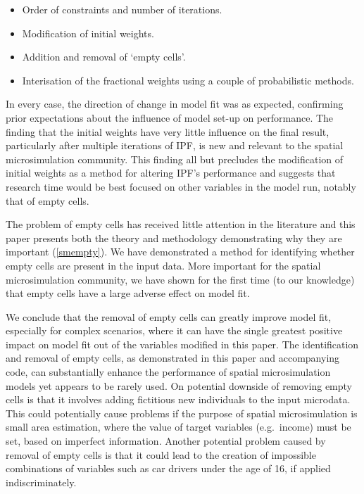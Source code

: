\documentclass[a4paper,10pt]{article}
\begin{document}
\begin{itemize}
 \item Order of constraints and number of iterations.
 \item Modification of initial weights.
 \item Addition and removal of `empty cells'.
 \item Interisation of the fractional weights using a couple of probabilistic methods.
\end{itemize}


In every case, the direction of change in model fit was as expected, confirming
prior expectations about the influence of model set-up on performance. The finding
that the initial weights have very little influence on the final result, particularly
after multiple iterations of IPF, is new and relevant to the spatial microsimulation
community. This finding all but precludes the modification of initial weights as
a method for altering IPF's performance and suggests that research time would be
best focused on other variables in the model run, notably that of empty cells.

The problem of empty cells has received little attention in the literature and
this paper presents both the theory and methodology demonstrating why they are important
(\cref{smempty}). We have demonstrated a method for identifying
whether empty cells are present in the input data. More important for the spatial microsimulation
community, we have shown for the first time (to our knowledge) that empty cells have a
large adverse effect on model fit.

We conclude that the removal of empty cells can greatly improve model fit,
especially for complex scenarios, where it can have the single greatest positive impact
on model fit out of the variables modified in this paper.
The identification and removal of empty cells, as
demonstrated in this paper and accompanying code, can substantially enhance the performance of
spatial microsimulation models yet appears to be rarely used.
On potential downside of removing empty cells is that it involves adding fictitious
new individuals to the input microdata. This could potentially cause problems if the
purpose of spatial microsimulation is small area estimation, where the
value of target variables (e.g.~income) must be set, based on imperfect information.
Another potential problem caused by removal of empty cells is that it could
lead to the creation of impossible combinations of variables such as car drivers under
the age of 16, if applied indiscriminately.
\end{document}
